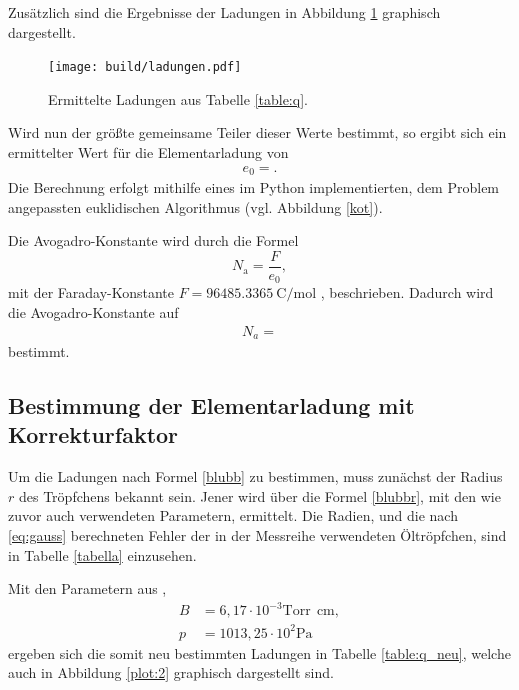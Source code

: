 Zusätzlich sind die Ergebnisse der Ladungen in Abbildung \ref{plot:1} graphisch dargestellt.
\begin{figure}
  \centering
  \texttt{[image: build/ladungen.pdf]}
  \caption{Ermittelte Ladungen aus Tabelle \ref{table:q}.}
  \label{plot:1}
\end{figure}

Wird nun der größte gemeinsame Teiler dieser Werte bestimmt, so ergibt sich ein ermittelter Wert für die Elementarladung von
\begin{align*}
  e_0 = .
\end{align*}
Die Berechnung erfolgt mithilfe eines im Python implementierten, dem Problem angepassten euklidischen Algorithmus (vgl. Abbildung \ref{kot}).

Die Avogadro-Konstante wird durch die Formel
\begin{equation}
  N_{\text{a}} = \frac{F}{e_0},
\end{equation}
mit der Faraday-Konstante $F = \SI{96485,3365}{\coulomb\per\mol}$ \cite{chemie}, beschrieben.
Dadurch wird die Avogadro-Konstante auf
\begin{align*}
  N_{a} = 
\end{align*}
bestimmt.


\subsection{Bestimmung der Elementarladung mit Korrekturfaktor}

Um die Ladungen nach Formel \eqref{blubb} zu bestimmen, muss zunächst der Radius $r$ des Tröpfchens bekannt sein.
Jener wird über die Formel \eqref{blubbr}, mit den wie zuvor auch verwendeten Parametern, ermittelt.
Die Radien, und die nach \ref{eq:gauss} berechneten Fehler der in der Messreihe verwendeten Öltröpfchen, sind in Tabelle \ref{tabella} einzusehen.



Mit den Parametern aus \cite{skript}, \cite{normaldruck}
\begin{align*}
  B &= 6,17\cdot 10^{-3}\text{Torr} \:\: \si{\centi\metre},\\
  p &= 1013,25\cdot10^2\si{\pascal}
\end{align*}
ergeben sich die somit neu bestimmten Ladungen in Tabelle \ref{table:q_neu}, welche auch in Abbildung \ref{plot:2} graphisch dargestellt sind.




